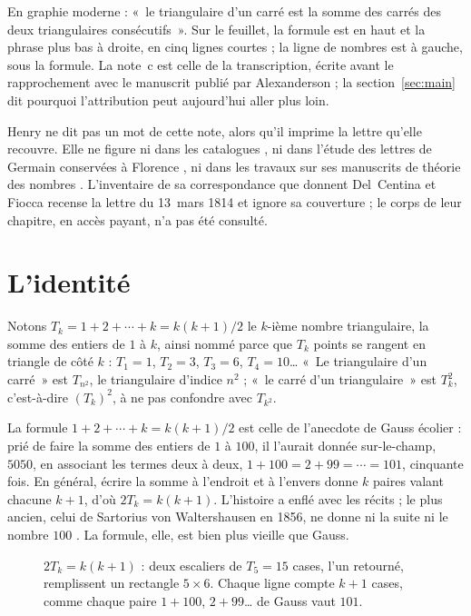 \documentclass[11pt,a4paper]{article}
\theoremstyle{remark}
\begin{document}
En graphie moderne : «~le triangulaire d'un carré est la somme des carrés
des deux triangulaires consécutifs~». Sur le feuillet, la formule est en haut et la phrase plus bas à droite, en
cinq lignes courtes ; la ligne de nombres est à gauche, sous la formule. La
note~c est celle de la transcription, écrite avant le rapprochement avec le
manuscrit publié par Alexanderson ; la section~\ref{sec:main} dit pourquoi
l'attribution peut aujourd'hui aller plus loin.

Henry ne dit pas un mot de cette note, alors qu'il imprime la lettre qu'elle
recouvre. Elle ne figure ni dans les catalogues \cite{delisle,omont}, ni
dans l'étude des lettres de Germain conservées à Florence \cite{delcentina},
ni dans les travaux sur ses manuscrits de théorie des nombres
\cite{laubenbacher-pengelley}. L'inventaire de sa correspondance que donnent
Del~Centina et Fiocca \cite[annexe]{delcentina-fiocca} recense la lettre du
13~mars 1814 et ignore sa couverture ; le corps de leur chapitre, en accès
payant, n'a pas été consulté.

\section{L'identité}\label{sec:identite}

Notons $T_k = 1 + 2 + \cdots + k = k(k+1)/2$ le $k$-ième nombre
triangulaire, la somme des entiers de $1$ à $k$, ainsi nommé parce que
$T_k$ points se rangent en triangle de côté $k$ : $T_1 = 1$, $T_2 = 3$,
$T_3 = 6$, $T_4 = 10$\dots{} \cite[A000217]{oeis} «~Le triangulaire d'un carré~» est
$T_{n^2}$, le triangulaire d'indice $n^2$ ; «~le carré d'un triangulaire~»
est $T_k^2$, c'est-à-dire $(T_k)^2$, à ne pas confondre avec $T_{k^2}$.

La formule $1 + 2 + \cdots + k = k(k+1)/2$ est celle de l'anecdote de Gauss
écolier : prié de faire la somme des entiers de $1$ à $100$, il l'aurait
donnée sur-le-champ, $5050$, en associant les termes deux à deux,
$1 + 100 = 2 + 99 = \cdots = 101$, cinquante fois. En général, écrire la
somme à l'endroit et à l'envers donne $k$ paires valant chacune $k+1$, d'où
$2T_k = k(k+1)$. L'histoire a enflé avec les récits ; le plus ancien, celui
de Sartorius von Waltershausen en 1856, ne donne ni la suite ni le nombre
$100$ \cite{hayes}. La formule, elle, est bien plus vieille que Gauss.

\begin{figure}[H]
\centering
{}
\caption{$2T_k = k(k+1)$ : deux escaliers de $T_5 = 15$ cases, l'un
retourné, remplissent un rectangle $5 \times 6$. Chaque ligne compte
$k + 1$ cases, comme chaque paire $1 + 100$, $2 + 99$\dots{} de Gauss
vaut $101$.}
\label{fig:gauss}
\end{figure}
\end{document}
